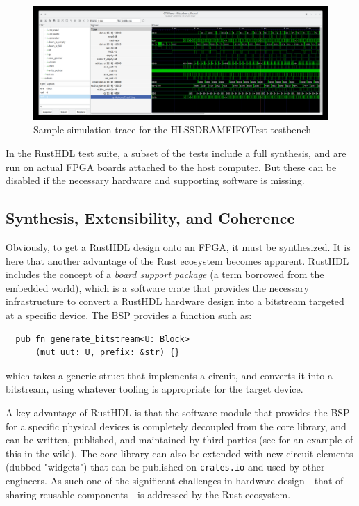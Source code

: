 \documentclass[conference]{IEEEtran}
\begin{document}
\begin{figure}[htbp]
  \centerline{\includegraphics[width=18cm]{hls_sdram_fifo.png}}
  \caption{Sample simulation trace for the \textrm{HLSSDRAMFIFOTest} testbench}
  \label{fig:trace}
\end{figure}
  
In the RustHDL test suite, a subset of the tests include a full synthesis, and are run on
actual FPGA boards attached to the host computer.  But these can be disabled if the necessary 
hardware and supporting software is missing.

\subsection{Synthesis, Extensibility, and Coherence}

Obviously, to get a RustHDL design onto an FPGA, it must be synthesized.  It is here that another 
advantage of the Rust ecosystem becomes apparent.  RustHDL includes the concept of a \emph{board support package} 
(a term borrowed from the embedded world), which is a software crate that provides the necessary infrastructure to
convert a RustHDL hardware design into a bitstream targeted at a specific device.  The BSP provides a function such 
as:

\begin{verbatim}
  pub fn generate_bitstream<U: Block>
      (mut uut: U, prefix: &str) {}
\end{verbatim}

which takes a generic struct that implements a circuit, and converts it into a bitstream, using whatever tooling is
appropriate for the target device.  

A key advantage of RustHDL is that the software module that provides the BSP for a specific physical devices is completely decoupled
from the core library, and can be written, published, and maintained by third parties (see \cite{b7} for an example of this in the wild).  
The core library can also be extended with new circuit elements (dubbed "widgets") that can be published on 
\verb|crates.io| and used by other engineers. As such one of the significant challenges in hardware design - 
that of sharing reusable components - is addressed by the Rust ecosystem.
\end{document}
